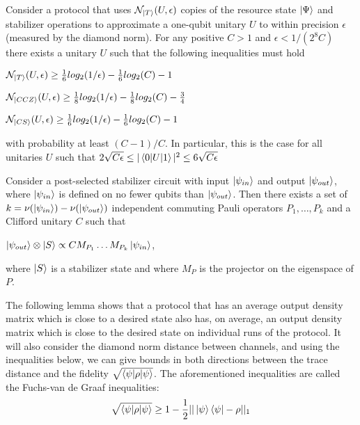 \documentclass[12pt]{dalthesis}
\begin{document}
\begin{theorem}
\label{Sec5mainTheorem}
Consider a protocol  that uses $\mathcal{N}_{\ket{T}}(U, \epsilon)$ copies of the resource state $\ket{\Psi}$ and stabilizer operations to approximate a one-qubit  unitary $U$ to within precision $\epsilon$ (measured by the diamond norm). For any positive $C>1$ and $\epsilon < 1/(2^8C)$ there exists a unitary $U$ such that the following inequalities must hold
\begin{center}
$\mathcal{N}_{\ket{T}}(U, \epsilon) \geq \frac{1}{6}log_2(1/\epsilon) - \frac{1}{6}log_2(C) - 1$
\end{center}
\begin{center}
$\mathcal{N}_{\ket{CCZ}}(U, \epsilon) \geq \frac{1}{8}log_2(1/\epsilon) - \frac{1}{8}log_2(C) - \frac{3}{4}$
\end{center}
\begin{center}
$\mathcal{N}_{\ket{CS}}(U, \epsilon) \geq \frac{1}{6}log_2(1/\epsilon) - \frac{1}{6}log_2(C) - 1$
\end{center}
with probability at least $(C-1)/C$. In particular, this is the case for all unitaries $U$ such that $2\sqrt{C \epsilon} \leq |\braket{0|U|1}|^2 \leq 6\sqrt{C \epsilon}$
\end{theorem}

\begin{theorem}
Consider a post-selected stabilizer circuit with input $\ket{\psi_{in}}$ and output $\ket{\psi_{out}}$, where $\ket{\psi_{in}}$ is defined on no fewer qubits than $\ket{\psi_{out}}$. Then there exists a set of $k = \nu (\ket{\psi_{in}})-\nu (\ket{\psi_{out}})$ independent commuting Pauli operators $P_1, \dots , P_k$ and a Clifford unitary $C$ such that 
\begin{center}
$\ket{\psi_{out}} \otimes \ket{S} \propto CM_{P_1} \dots M_{P_k} \ket{\psi_{in}}$,
\end{center}
where $\ket{S}$ is a stabilizer state and where $M_P$ is the projector on the eigenspace of $P$.
\end{theorem}

The following lemma shows that a protocol that has an average output density matrix which is close to a desired state also has, on average, an output density matrix which is close to the desired state on individual runs of the protocol. It will also consider the diamond norm distance between channels, and using the inequalities below, we can give bounds in both directions between the trace distance and the fidelity $\sqrt{\braket{\psi | \rho | \psi}}$. The aforementioned inequalities are called the Fuchs-van de Graaf inequalities:
\begin{equation}
\sqrt{\braket{\psi | \rho | \psi}} \geq 1 -\frac{1}{2}||\ket{\psi} \bra{\psi} - \rho ||_1
\end{equation}
\end{document}
